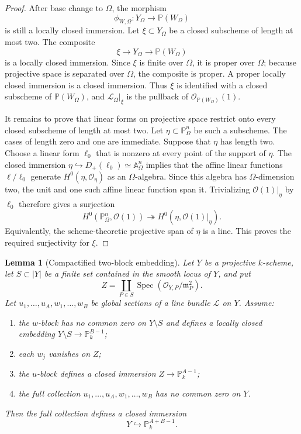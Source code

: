 \documentclass{lms}
\newtheorem{lemma}[theorem]{Lemma}
\newenvironment{alphlist}
  {\begin{enumerate}[b]\renewcommand{\theenumi}{\textup{(\alph{enumi})}}}
  {\end{enumerate}}
\DeclareMathOperator{\Spec}{Spec}
\newcommand{\PP}{\mathbb P}
\newcommand{\OO}{\mathcal O}
\newcommand{\mm}{\mathfrak m}
\begin{document}
\begin{proof}
After base change to $\Omega$, the morphism
\[
        \phi_{W,\Omega}:Y_\Omega\to\PP(W_\Omega)
\]
is still a locally closed immersion.  Let $\xi\subset Y_\Omega$ be a closed subscheme of length at most two.  The composite
\[
        \xi\longrightarrow Y_\Omega\longrightarrow\PP(W_\Omega)
\]
is a locally closed immersion.  Since $\xi$ is finite over $\Omega$, it is proper over $\Omega$; because projective space is separated over $\Omega$, the composite is proper.  A proper locally closed immersion is a closed immersion.  Thus $\xi$ is identified with a closed subscheme of $\PP(W_\Omega)$, and $\mathcal L_\Omega|_\xi$ is the pullback of $\OO_{\PP(W_\Omega)}(1)$.

It remains to prove that linear forms on projective space restrict onto every closed subscheme of length at most two.  Let $\eta\subset\PP^n_\Omega$ be such a subscheme.  The cases of length zero and one are immediate.  Suppose that $\eta$ has length two.  Choose a linear form $\ell_0$ that is nonzero at every point of the support of $\eta$.  The closed immersion $\eta\hookrightarrow D_+(\ell_0)\simeq\mathbb A^n_\Omega$ implies that the affine linear functions $\ell/\ell_0$ generate $H^0(\eta,\OO_\eta)$ as an $\Omega$-algebra.  Since this algebra has $\Omega$-dimension two, the unit and one such affine linear function span it.  Trivializing $\OO(1)|_\eta$ by $\ell_0$ therefore gives a surjection
\[
        H^0(\PP^n_\Omega,\OO(1))\twoheadrightarrow H^0(\eta,\OO(1)|_\eta).
\]
Equivalently, the scheme-theoretic projective span of $\eta$ is a line.  This proves the required surjectivity for $\xi$.
\end{proof}

\begin{lemma}[Compactified two-block embedding]\label{lem:two-block-separation}
Let $Y$ be a projective $k$-scheme, let $S\subset |Y|$ be a finite set contained in the smooth locus of $Y$, and put
\[
        Z=\coprod_{P\in S}\Spec(\OO_{Y,P}/\mm_P^2).
\]
Let $u_1,\ldots,u_A,w_1,\ldots,w_B$ be global sections of a line bundle $\mathcal L$ on $Y$.  Assume:
\begin{alphlist}
\item the $w$-block has no common zero on $Y\setminus S$ and defines a locally closed embedding $Y\setminus S\to\PP^{B-1}_k$;
\item each $w_j$ vanishes on $Z$;
\item the $u$-block defines a closed immersion $Z\to\PP^{A-1}_k$;
\item the full collection $u_1,\ldots,u_A,w_1,\ldots,w_B$ has no common zero on $Y$.
\end{alphlist}
Then the full collection defines a closed immersion
\[
        Y\hookrightarrow\PP^{A+B-1}_k .
\]
\end{lemma}
\end{document}
